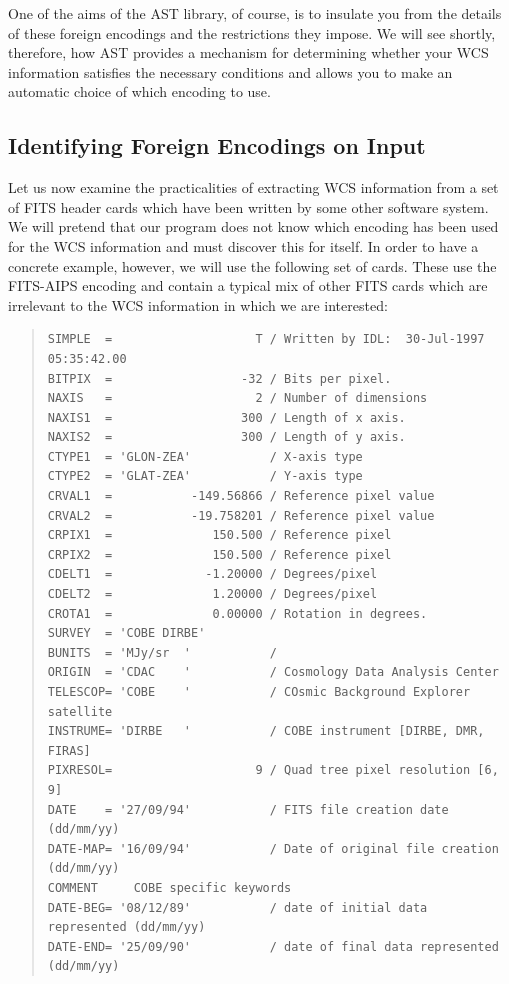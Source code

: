 \documentclass[twoside,11pt]{article}
\begin{document}
One of the aims of the AST library, of course, is to insulate you from
the details of these foreign encodings and the restrictions they
impose. We will see shortly, therefore, how AST provides a mechanism
for determining whether your WCS information satisfies the necessary
conditions and allows you to make an automatic choice of which
encoding to use.

\subsection{\label{ss:identifyingfitsencoding}Identifying Foreign Encodings on Input}

Let us now examine the practicalities of extracting WCS information
from a set of FITS header cards which have been written by some other
software system. We will pretend that our program does not know which
encoding has been used for the WCS information and must discover this
for itself. In order to have a concrete example, however, we will use
the following set of cards. These use the FITS-AIPS encoding and
contain a typical mix of other FITS cards which are irrelevant to the
WCS information in which we are interested:

\begin{quote}
\small
\begin{verbatim}
SIMPLE  =                    T / Written by IDL:  30-Jul-1997 05:35:42.00
BITPIX  =                  -32 / Bits per pixel.
NAXIS   =                    2 / Number of dimensions
NAXIS1  =                  300 / Length of x axis.
NAXIS2  =                  300 / Length of y axis.
CTYPE1  = 'GLON-ZEA'           / X-axis type
CTYPE2  = 'GLAT-ZEA'           / Y-axis type
CRVAL1  =           -149.56866 / Reference pixel value
CRVAL2  =           -19.758201 / Reference pixel value
CRPIX1  =              150.500 / Reference pixel
CRPIX2  =              150.500 / Reference pixel
CDELT1  =             -1.20000 / Degrees/pixel
CDELT2  =              1.20000 / Degrees/pixel
CROTA1  =              0.00000 / Rotation in degrees.
SURVEY  = 'COBE DIRBE'
BUNITS  = 'MJy/sr  '           /
ORIGIN  = 'CDAC    '           / Cosmology Data Analysis Center
TELESCOP= 'COBE    '           / COsmic Background Explorer satellite
INSTRUME= 'DIRBE   '           / COBE instrument [DIRBE, DMR, FIRAS]
PIXRESOL=                    9 / Quad tree pixel resolution [6, 9]
DATE    = '27/09/94'           / FITS file creation date (dd/mm/yy)
DATE-MAP= '16/09/94'           / Date of original file creation (dd/mm/yy)
COMMENT     COBE specific keywords
DATE-BEG= '08/12/89'           / date of initial data represented (dd/mm/yy)
DATE-END= '25/09/90'           / date of final data represented   (dd/mm/yy)
\end{verbatim}
\normalsize
\end{quote}
\end{document}
